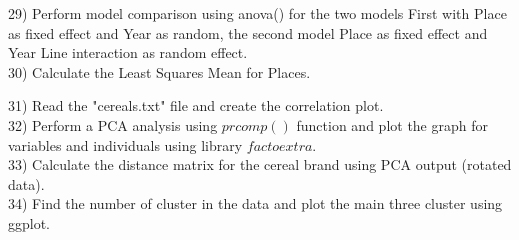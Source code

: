 \documentclass{article}
\begin{document}
29) Perform model comparison using anova() for the two  models First with Place as fixed effect and Year as random, the second model Place as fixed effect and Year Line interaction as random effect.\\

30) Calculate the Least Squares Mean for Places.

31) Read the "cereals.txt" file and create the correlation plot.\\

32) Perform a PCA analysis using $prcomp()$ function and plot the graph for variables and individuals using library $factoextra$.\\

33) Calculate the distance matrix for the cereal brand using PCA output (rotated data).\\

34) Find the number of cluster in the data and plot the main three cluster using ggplot.\\
\end{document}
